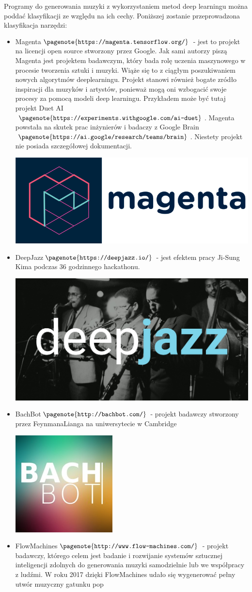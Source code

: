 	Programy do generowania muzyki z wykorzystaniem metod deep learningu można poddać klasyfikacji ze względu na ich cechy.	
 Poniższej zostanie przeprowadzona klasyfikacja narzędzi:
 \begin{itemize}
 	\item Magenta$\pagenote{\texttt{https://magenta.tensorflow.org/}}$ - jest to projekt na licencji open source stworzony przez Google. Jak sami autorzy piszą Magenta jest projektem badawczym, który bada rolę uczenia maszynowego w procesie tworzenia sztuki i muzyki. Wiąże się to z ciągłym poszukiwaniem nowych algorytmów deeplearningu. Projekt stanowi również bogate zródło inspiracji dla muzyków i artystów, ponieważ mogą oni wzbogacić swoje procesy za pomocą modeli deep learningu. Przykładem może być tutaj projekt Duet AI$\pagenote{\texttt{https://experiments.withgoogle.com/ai-duet}}$. Magenta powstała na skutek prac inżynierów i badaczy z Google Brain$\pagenote{\texttt{https://ai.google/research/teams/brain}}$. Niestety projekt nie posiada szczegółowej dokumentacji. \text{}\\
 	\centerline{\includegraphics[width=0.2\linewidth]{magenta-logo}}
 	\item DeepJazz$\pagenote{\texttt{https://deepjazz.io/}}$ - jest efektem pracy Ji-Sung Kima podczas 36 godzinnego hackathonu. \text{}\\
 	\centerline{\includegraphics[width=0.2\linewidth]{deep-jazz}}
 	\item BachBot$\pagenote{\texttt{http://bachbot.com/}}$ - projekt badawczy stworzony przez FeynmanaLianga na uniwersytecie w Cambridge \text{}\\
 	\centerline{\includegraphics[width=0.2\linewidth]{bach-bot}}
 	\item FlowMachines$\pagenote{\texttt{http://www.flow-machines.com/}}$ - projekt badawczy, którego celem jest badanie i rozwijanie systemów sztucznej inteligencji zdolnych do generowania muzyki samodzielnie lub we współpracy z ludźmi. W roku 2017 dzięki FlowMachines udało się wygenerować pełny utwór muzyczny gatunku pop  \text{}\\

\end{itemize}
